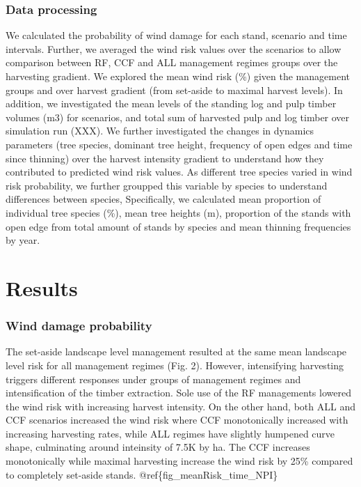 \documentclass[]{elsarticle} %
\begin{document}
\subsubsection{Data processing}\label{data-processing}

We calculated the probability of wind damage for each stand, scenario
and time intervals. Further, we averaged the wind risk values over the
scenarios to allow comparison between RF, CCF and ALL management regimes
groups over the harvesting gradient. We explored the mean wind risk (\%)
given the management groups and over harvest gradient (from set-aside to
maximal harvest levels). In addition, we investigated the mean levels of
the standing log and pulp timber volumes (m3) for scenarios, and total
sum of harvested pulp and log timber over simulation run (XXX). We
further investigated the changes in dynamics parameters (tree species,
dominant tree height, frequency of open edges and time since thinning)
over the harvest intensity gradient to understand how they contributed
to predicted wind risk values. As different tree species varied in wind
risk probability, we further groupped this variable by species to
understand differences between species, Specifically, we calculated mean
proportion of individual tree species (\%), mean tree heights (m),
proportion of the stands with open edge from total amount of stands by
species and mean thinning frequencies by year.

\section{Results}\label{results}

\subsubsection{Wind damage probability}\label{wind-damage-probability}

The set-aside landscape level management resulted at the same mean
landscape level risk for all management regimes (Fig. 2). However,
intensifying harvesting triggers different responses under groups of
management regimes and intensification of the timber extraction. Sole
use of the RF managements lowered the wind risk with increasing harvest
intensity. On the other hand, both ALL and CCF scenarios increased the
wind risk where CCF monotonically increased with increasing harvesting
rates, while ALL regimes have slightly humpened curve shape, culminating
around inteinsity of 7.5K by ha. The CCF increases monotonically while
maximal harvesting increase the wind risk by 25\% compared to completely
set-aside stands. @ref\{fig\_meanRisk\_time\_NPI\}
\end{document}
